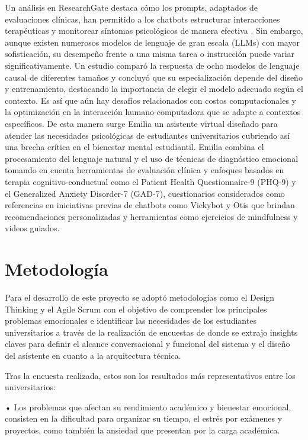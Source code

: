 \documentclass[conference]{IEEEtran}
\begin{document}
Un análisis en ResearchGate destaca cómo los prompts, adaptados de evaluaciones clínicas, han permitido a los chatbots estructurar interacciones terapéuticas y monitorear síntomas psicológicos de manera efectiva \cite{b13}. Sin embargo, aunque existen numerosos modelos de lenguaje de gran escala (LLMs) con mayor sofisticación, su desempeño frente a una misma tarea o instrucción puede variar significativamente. Un estudio comparó la respuesta de ocho modelos de lenguaje causal de diferentes tamaños y concluyó que su especialización depende del diseño y entrenamiento, destacando la importancia de elegir el modelo adecuado según el contexto. \cite{b14}
Es así que aún hay desafíos relacionados con costos computacionales y la optimización en la interacción humano-computadora que se adapte a contextos específicos. De esta manera surge Emilia un asistente virtual diseñado para atender las necesidades psicológicas de estudiantes universitarios cubriendo así una brecha crítica en el bienestar mental estudiantil.
Emilia combina el procesamiento del lenguaje natural y el uso de técnicas de diagnóstico emocional tomando en cuenta herramientas de evaluación clínica y enfoques basados en terapia cognitivo-conductual como el Patient Health Questionnaire-9 (PHQ-9) y el Generalized Anxiety Disorder-7 (GAD-7), cuestionarios considerados como referencias en iniciativas previas de chatbots como Vickybot \cite{b15} y Otis \cite{b16} que brindan recomendaciones personalizadas y herramientas como ejercicios de mindfulness y videos guiados. 

\section{Metodología}
Para el desarrollo de este proyecto se adoptó metodologías como el Design Thinking y el Agile Scrum con el objetivo de comprender los principales problemas emocionales e identificar las necesidades de los estudiantes universitarios a través de la realización de encuestas de donde se extrajo insights claves para definir el alcance conversacional y funcional del sistema y el diseño del asistente en cuanto a la arquitectura técnica.

Tras la encuesta realizada, estos son los resultados más representativos entre los universitarios:

•	Los problemas que afectan su rendimiento académico y bienestar emocional, consisten en la dificultad para organizar su tiempo, el estrés por exámenes y proyectos, como también la ansiedad que presentan por la carga académica.
\end{document}
